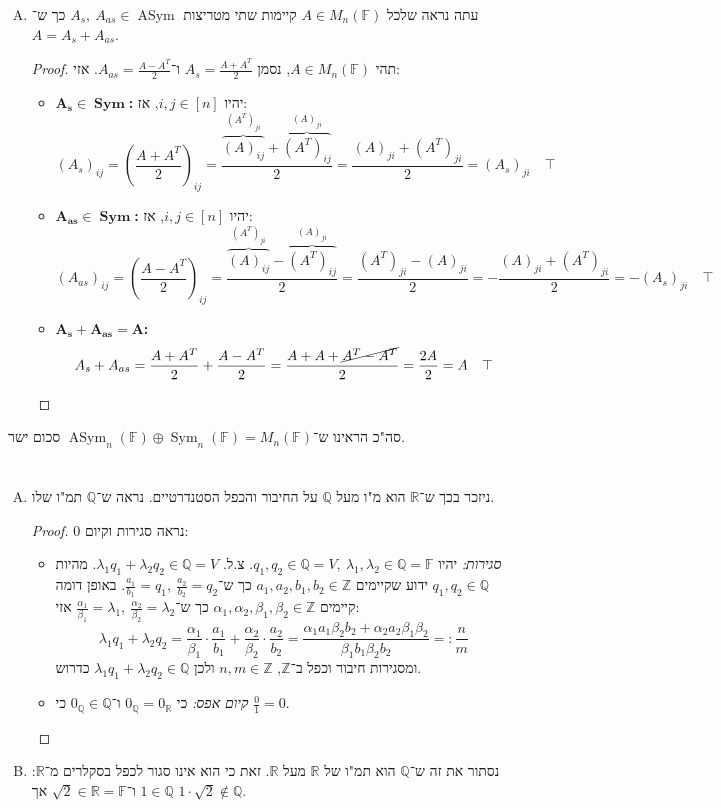 \documentclass[]{article}
\newcommand\Z     {\mathbb{Z}}
\newcommand\R     {\mathbb{R}}
\newcommand\Q     {\mathbb{Q}}
\DeclareMathOperator{\Sym}     {Sym}
\DeclareMathOperator{\ASym}    {ASym}
\newcommand\F         {\mathbb{F}}
\newcommand\ag        {\alpha}
\newcommand\bg        {\beta}
\renewcommand\lg      {\lambda}
\newcommand\cl [1]    {\left ( #1 \right )}
\theoremstyle{definition}
\begin{document}
\begin{enumerate}[(A)]
		\item עתה נראה שלכל $A \in M_n(\F)$ קיימות שתי מטריצות $A_s, \ A_{as} \in \ASym$ כך ש־$A = A_s + A_{as}$. \begin{proof}
			תהי $A \in M_n(\F)$, נסמן $A_s = \frac{A + A^T}{2}$ ו־$A_{as} = \frac{A - A^T}{2}$. אזי: 
			\begin{itemize}
				\item $\bm{A_s \in \Sym}$\textbf{: }יהיו $i, j \in [n]$, אז: 
				\[ (A_s)_{ij} = \cl{\frac{A + A^T}{2}}_{ij} = \frac{\overbrace{(A)_{ij}}^{(A^T)_{ji}} + \overbrace{(A^T)_{ij}}^{(A)_{ji}}}{2} = \frac{(A)_{ji} + (A^T)_{ji}}{2} = (A_s)_{ji} \quad \top \]
				\item $\bm{A_{as} \in \Sym}$\textbf{: }יהיו $i, j \in [n]$, אז: 
				\[ (A_{as})_{ij} = \cl{\frac{A - A^T}{2}}_{ij} = \frac{\overbrace{(A)_{ij}}^{(A^T)_{ji}} - \overbrace{(A^T)_{ij}}^{(A)_{ji}}}{2} = \frac{(A^T)_{ji} - (A)_{ji}}{2} = -\frac{(A)_{ji} + (A^T)_{ji}}{2} = -(A_s)_{ji} \quad \top \]
				\item $\bm{A_s + A_{as} = A}$\textbf{: }
				\[ A_s + A_{as} = \frac{A + A^T}{2} + \frac{A - A^T}{2} = \frac{A + A + \cancel{A^T - A^T}}{2} = \frac{2A}{2} = A \quad \top \]
			\end{itemize}
		\end{proof}
	\end{enumerate}
	סה"כ הראינו ש־$\ASym_n(\F) \oplus \Sym_n(\F) = M_n(\F)$ סכום ישר. 
	
	\section{}
	\begin{enumerate}[(A)]
		\item ניזכר בכך ש־$\R$ הוא מ"ו מעל $\Q$ על החיבור והכפל הסטנדרטיים. נראה ש־$\Q$ תמ"ו שלו. \begin{proof}
			נראה סגירות וקיום 0: 
			\begin{itemize}
				\item \textit{סגירות: }יהיו $q_1, q_2 \in \Q = V, \ \lg_1, \lg_2 \in \Q = \F$. צ.ל. $\lg_1 q_1 + \lg_2 q_2 \in \Q = V$. מהיות $q_1, q_2 \in \Q$ ידוע שקיימים $a_1, a_2, b_1, b_2 \in \Z$ כך ש־$\frac{a_1}{b_1} = q_1, \ \frac{a_2}{b_2} = q_2$. באופן דומה קיימים $\ag_1, \ag_2, \bg_1, \bg_2 \in \Z$ כך ש־$\frac{\ag_1}{\bg_1} = \lg_1, \ \frac{\ag_2}{\bg_2} = \lg_2$
				 אזי: 
				\[ \lg_1 q_1 + \lg_2 q_2 = \frac{\ag_1}{\bg_1}\cdot \frac{a_1}{b_1} + \frac{\ag_2}{\bg_2} \cdot \frac{a_2}{b_2} = \frac{\ag_1 a_1 \bg_2 b_2 + \ag_2 a_2 \bg_1 \bg_2}{\bg_1b_1\bg_2b_2} =: \frac{n}{m} \]
				ומסגירות חיבור וכפל ב־$\Z$, $n, m \in \Z$ ולכן $\lg_1 q_1 + \lg_2 q_2 \in \Q$ כדרוש. 
				\item \textit{קיום אפס: }כי $0_\Q = 0_\R$ ו־$0_\Q \in \Q$ כי $\frac{0}{1} = 0$. 
			\end{itemize}
		\end{proof}
		\item נסתור את זה ש־$\Q$ הוא תמ"ו של $\R$ מעל $\R$. זאת כי הוא אינו סגור לכפל בסקלרים מ־$\R$: $1 \in \Q$ ו־$\sqrt{2} \in \R = \F$ אך $1 \cdot \sqrt{2} \notin \Q$. 
	\end{enumerate}
	
\end{document}

